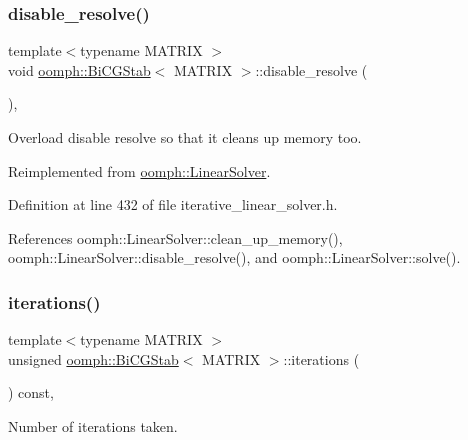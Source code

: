 \subsubsection{\texorpdfstring{disable\+\_\+resolve()}{disable\_resolve()}}
{\footnotesize\ttfamily template$<$typename M\+A\+T\+R\+IX $>$ \\
void \hyperlink{classoomph_1_1BiCGStab}{oomph\+::\+Bi\+C\+G\+Stab}$<$ M\+A\+T\+R\+IX $>$\+::disable\+\_\+resolve (\begin{DoxyParamCaption}{ }\end{DoxyParamCaption})\hspace{0.3cm}{\ttfamily [inline]}, {\ttfamily [virtual]}}



Overload disable resolve so that it cleans up memory too. 



Reimplemented from \hyperlink{classoomph_1_1LinearSolver_ad61c63af94c5961830bd9807225a48d6}{oomph\+::\+Linear\+Solver}.



Definition at line 432 of file iterative\+\_\+linear\+\_\+solver.\+h.



References oomph\+::\+Linear\+Solver\+::clean\+\_\+up\+\_\+memory(), oomph\+::\+Linear\+Solver\+::disable\+\_\+resolve(), and oomph\+::\+Linear\+Solver\+::solve().

\mbox{\label{classoomph_1_1BiCGStab_a2550adba752e02423254dc0a6c592f7f}} 
\subsubsection{\texorpdfstring{iterations()}{iterations()}}
{\footnotesize\ttfamily template$<$typename M\+A\+T\+R\+IX $>$ \\
unsigned \hyperlink{classoomph_1_1BiCGStab}{oomph\+::\+Bi\+C\+G\+Stab}$<$ M\+A\+T\+R\+IX $>$\+::iterations (\begin{DoxyParamCaption}{ }\end{DoxyParamCaption}) const\hspace{0.3cm}{\ttfamily [inline]}, {\ttfamily [virtual]}}



Number of iterations taken. 



